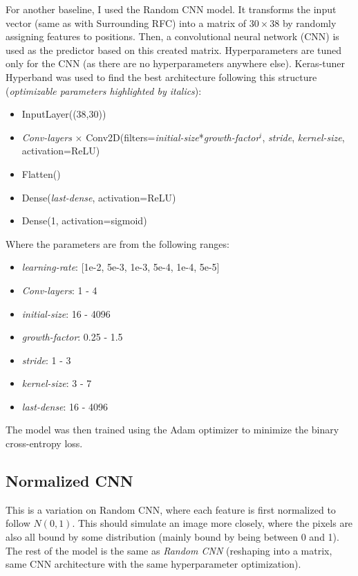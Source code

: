 For another baseline, I used the Random CNN model. It transforms the input vector (same as with Surrounding RFC) into a matrix of $30 \times 38$ by randomly assigning features to positions. Then, a convolutional neural network (CNN) is used as the predictor based on this created matrix. Hyperparameters are tuned only for the CNN (as there are no hyperparameters anywhere else). Keras-tuner Hyperband was used to find the best architecture following this structure (\textit{optimizable parameters highlighted by italics}):
\begin{itemize}
    \item InputLayer((38,30))
    \item \textit{Conv-layers} $\times$ Conv2D(filters=\textit{initial-size}*\textit{growth-factor}$^i$, \textit{stride}, \textit{kernel-size}, activation=ReLU)
    \item Flatten()
    \item Dense(\textit{last-dense}, activation=ReLU)
    \item Dense(1, activation=sigmoid)
\end{itemize}
Where the parameters are from the following ranges:
\begin{itemize}
    \item \textit{learning-rate}: [1e-2, 5e-3, 1e-3, 5e-4, 1e-4, 5e-5]
    \item \textit{Conv-layers}: 1 - 4
    \item \textit{initial-size}: 16 - 4096
    \item \textit{growth-factor}: 0.25 - 1.5
    \item \textit{stride}: 1 - 3
    \item \textit{kernel-size}: 3 - 7
    \item \textit{last-dense}: 16 - 4096
\end{itemize}

The model was then trained using the Adam optimizer to minimize the binary cross-entropy loss. 

\subsection{Normalized CNN}

This is a variation on Random CNN, where each feature is first normalized to follow $N(0, 1)$. This should simulate an image more closely, where the pixels are also all bound by some distribution (mainly bound by being between 0 and 1). The rest of the model is the same as \textit{Random CNN} (reshaping into a matrix, same CNN architecture with the same hyperparameter optimization).

